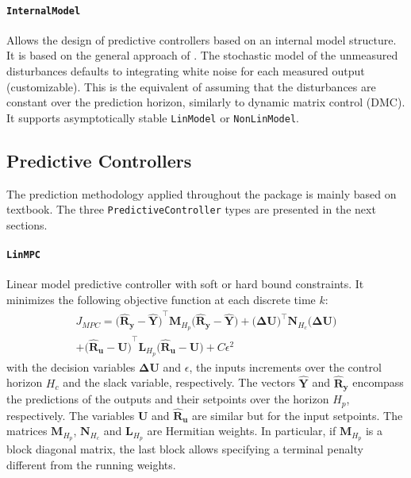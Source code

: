 \paragraph{\texttt{InternalModel}}
Allows the design of predictive controllers based on an internal model structure. It is based on the general approach of \citet{globPC}. The stochastic model of the unmeasured disturbances defaults to integrating white noise for each measured output (customizable). This is the equivalent of assuming that the disturbances are constant over the prediction horizon, similarly to dynamic matrix control (DMC). It supports asymptotically stable \texttt{LinModel} or \texttt{NonLinModel}.

\subsection{Predictive Controllers}

The prediction methodology applied throughout the package is mainly based on \citet{mpcMac} textbook. The three \texttt{PredictiveController} types are presented in the next sections.

\paragraph{\texttt{LinMPC}}
Linear model predictive controller with soft or hard bound constraints. It minimizes the following objective function at each discrete time $k$:
\begin{multline}\label{eq:J_MPC}
J_{\mathit{MPC}} = 
    \mathbf{\big(\hat{R}_y - \hat{Y}\big)}^\intercal \mathbf{M}_{H_p} \mathbf{\big(\hat{R}_y - \hat{Y}\big)}   
    + \mathbf{\big(ΔU\big)}^\intercal \mathbf{N}_{H_c} \mathbf{\big(ΔU\big)} \\
    + \mathbf{\big(\hat{R}_u - U\big)}^\intercal \mathbf{L}_{H_p} \mathbf{\big(\hat{R}_u - U\big)} 
    + C \epsilon^2
\end{multline}
with the decision variables $\mathbf{ΔU}$ and $\epsilon$, the inputs increments over the control horizon $H_c$ and the slack variable, respectively. The vectors $\mathbf{\hat{Y}}$ and $\mathbf{\hat{R}_y}$ encompass the predictions of the outputs and their setpoints over the horizon $H_p$, respectively. The variables $\mathbf{U}$ and $\mathbf{\hat{R}_u}$ are similar but for the input setpoints. The matrices $\mathbf{M}_{H_p}$, $\mathbf{N}_{H_c}$ and $\mathbf{L}_{H_p}$ are Hermitian weights. In particular, if $\mathbf{M}_{H_p}$ is a block diagonal matrix, the last block allows specifying a terminal penalty different from the running weights.


